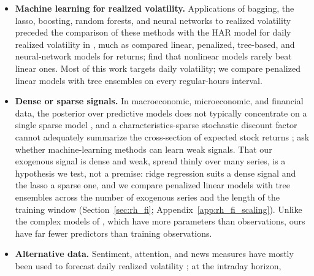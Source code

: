 \begin{itemize}
  realized volatility of related assets that trade while the home market is closed \citep{TodorovaSoucek2014},
  improve volatility forecasts, and for the S\&P~500 futures \citet{StroudJohannes2014} argue that deleting the
  overnight returns removes important information. These studies forecast daily or session volatility; we carry the
  idea to the intraday interval by computing our predictors over the futures' full intraday grid, overnight
  intervals included (Section~\ref{sec:rh_predictors}).
\item \textbf{Machine learning for realized volatility.} Applications of bagging, the lasso, boosting, random
  forests, and neural networks to realized volatility \citep{HillebrandMedeiros2010,AudrinoKnaus2016,
  MittnikRobinzonovSpindler2015,LuongDokuchaev2018,RahimikiaPoon2020} preceded the comparison of these methods with
  the HAR model for daily realized volatility in \citet{christensen2023machine}, much as \citet{gu2020empirical}
  compared linear, penalized, tree-based, and neural-network models for returns; \citet{BrancoRubesamZevallos2024}
  find that nonlinear models rarely beat linear ones. Most of this work targets daily volatility; we compare
  penalized linear models with tree ensembles on every regular-hours interval.
\item \textbf{Dense or sparse signals.} In macroeconomic, microeconomic, and financial data, the posterior over
  predictive models does not typically concentrate on a single sparse model \citep{GiannoneLenzaPrimiceri2021}, and
  a characteristics-sparse stochastic discount factor cannot adequately summarize the cross-section of expected
  stock returns \citep{KozakNagelSantosh2020}; \citet{ShenXiu2025} ask whether machine-learning methods can learn
  weak signals. That our exogenous signal is dense and weak, spread thinly over many series, is a hypothesis we
  test, not a premise: ridge regression suits a dense signal and the lasso a sparse one, and we compare penalized
  linear models with tree ensembles across the number of exogenous series and the length of the training window
  (Section~\ref{sec:rh_fi}; Appendix~\ref{app:rh_fi_scaling}). Unlike the complex models of
  \citet{KellyMalamudZhou2024}, which have more parameters
  than observations, ours have far fewer predictors than training observations.
\item \textbf{Alternative data.} Sentiment, attention, and news measures have mostly been used to forecast daily
  realized volatility \citep{AudrinoSigristBallinari2020,CaporinPoli2017}; at the intraday horizon,

\end{itemize}
